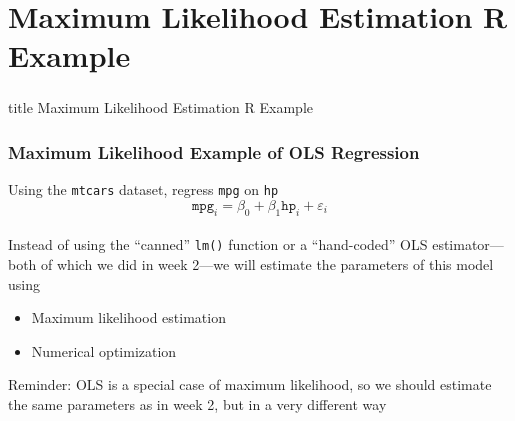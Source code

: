 \documentclass{beamer}\usepackage[]{graphicx}\usepackage[]{color}
\begin{document}
\section{Maximum Likelihood Estimation R Example}
\label{example}
\begin{frame}\frametitle{}
    \vfill
    \centering
    \begin{beamercolorbox}[center]{title}
        \Large Maximum Likelihood Estimation R Example
    \end{beamercolorbox}
    \vfill
\end{frame}

\begin{frame}\frametitle{Maximum Likelihood Example of OLS Regression}
    Using the \texttt{mtcars} dataset, regress \texttt{mpg} on \texttt{hp}
    $$\texttt{mpg}_i = \beta_0 + \beta_1 \texttt{hp}_i + \varepsilon_i$$ \\
    \vspace{3ex}
    Instead of using the ``canned'' \texttt{lm()} function or a ``hand-coded'' OLS estimator---both of which we did in week 2---we will estimate the parameters of this model using
    \begin{itemize}
        \item Maximum likelihood estimation
        \item Numerical optimization
    \end{itemize}
    \vspace{3ex}
    Reminder: OLS is a special case of maximum likelihood, so we should estimate the same parameters as in week 2, but in a very different way
\end{frame}
\end{document}
